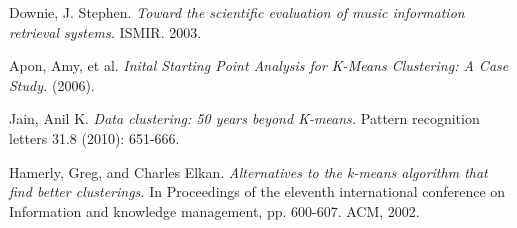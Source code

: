 \begin{thebibliography}{9}
                Downie, J. Stephen. 
                \emph{Toward the scientific evaluation of music information retrieval systems.} 
                ISMIR. 2003.

                Apon, Amy, et al. 
                \emph{Inital Starting Point Analysis for K-Means Clustering: A Case Study.} 
                (2006).

                Jain, Anil K. 
                \emph{Data clustering: 50 years beyond K-means.} 
                Pattern recognition letters 31.8 (2010): 651-666.

                Hamerly, Greg, and Charles Elkan. 
                \emph{Alternatives to the k-means algorithm that find better clusterings.} 
                In Proceedings of the eleventh international conference on Information and knowledge management, pp. 600-607.
                ACM, 2002.

\end{thebibliography}
